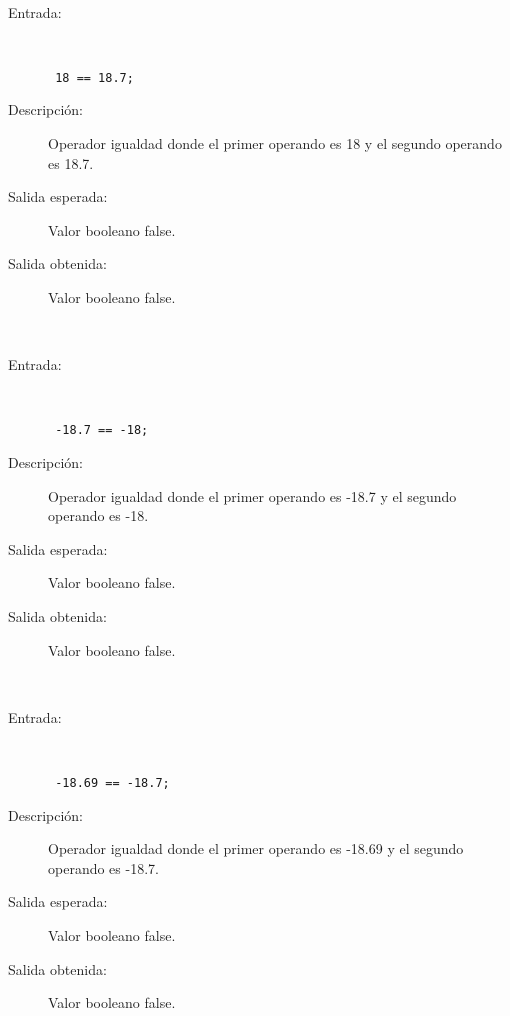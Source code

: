 \hfil \\
	\begin{description}
		\item [Entrada:] \hfill \\
\begin{lstlisting}
 18 == 18.7;
\end{lstlisting}
		\item [Descripción:] Operador igualdad donde el primer operando es 18 y el segundo operando es  18.7.
		\item [Salida esperada:] Valor booleano false.
		\item [Salida obtenida:] Valor booleano false.
	\end{description}
\hfil \\
	\begin{description}
		\item [Entrada:] \hfill \\
\begin{lstlisting}
 -18.7 == -18;
\end{lstlisting}
		\item [Descripción:] Operador igualdad donde el primer operando es -18.7 y el segundo operando es  -18.
		\item [Salida esperada:] Valor booleano false.
		\item [Salida obtenida:] Valor booleano false.
	\end{description}
\hfil \\
	\begin{description}
		\item [Entrada:] \hfill \\
\begin{lstlisting}
 -18.69 == -18.7;
\end{lstlisting}
		\item [Descripción:] Operador igualdad donde el primer operando es -18.69 y el segundo operando es  -18.7.
		\item [Salida esperada:] Valor booleano false.
		\item [Salida obtenida:] Valor booleano false.
	\end{description}
\hfil \\
